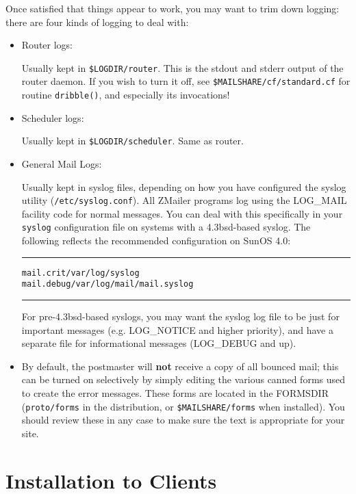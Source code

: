 Once satisfied that things appear to work, you may want to trim down
logging: there are four kinds of logging to deal with:
\begin{itemize}
\item Router logs:

Usually kept in {\tt \$LOGDIR/router}.  This is the stdout
and stderr output of the router daemon.  If you wish to turn it off,
see {\tt\$MAILSHARE/cf/standard.cf} for routine  {\tt dribble()},
and especially its invocations!

\item Scheduler logs:

Usually kept in {\tt \$LOGDIR/scheduler}.  Same as router.

\vspace{1pt}
\item General Mail Logs:

Usually kept in syslog files, depending on how you have configured
the syslog utility ({\tt /etc/syslog.conf}).
All ZMailer programs log using the LOG\_MAIL facility code for normal
messages.  You can deal with this specifically in your {\tt syslog}
configuration file on systems with a 4.3bsd-based syslog.  The
following reflects the recommended configuration on SunOS 4.0:
\begin{alltt}\medskip\hrule\medskip
mail.crit   /var/log/syslog
mail.debug  /var/log/mail/mail.syslog
\medskip\hrule\end{alltt}\medskip

For pre-4.3bsd-based syslogs, you may want the syslog log file
to be just for important messages (e.g. LOG\_NOTICE and higher
priority), and have a separate file for informational messages
(LOG\_DEBUG and up).

\item By default, the postmaster will {\bf not} receive a copy
of all bounced mail; this can be turned on selectively by simply
editing the various canned forms used to create the error messages.
These forms are located in the FORMSDIR ({\tt proto/forms} in
the distribution, or {\tt \$MAILSHARE/forms} when installed).
You should review these in any case to make sure the text is
appropriate for your site.

\end{itemize}


\section{Installation to Clients}

